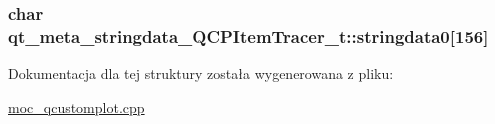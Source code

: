 \subsubsection[{\texorpdfstring{stringdata0}{stringdata0}}]{\setlength{\rightskip}{0pt plus 5cm}char qt\+\_\+meta\+\_\+stringdata\+\_\+\+Q\+C\+P\+Item\+Tracer\+\_\+t\+::stringdata0\mbox{[}156\mbox{]}}\hypertarget{structqt__meta__stringdata___q_c_p_item_tracer__t_a716a4a42fdc434d4a1e9e7b141e3715d}{}\label{structqt__meta__stringdata___q_c_p_item_tracer__t_a716a4a42fdc434d4a1e9e7b141e3715d}


Dokumentacja dla tej struktury została wygenerowana z pliku\+:\begin{DoxyCompactItemize}
\item 
\hyperlink{moc__qcustomplot_8cpp}{moc\+\_\+qcustomplot.\+cpp}\end{DoxyCompactItemize}
